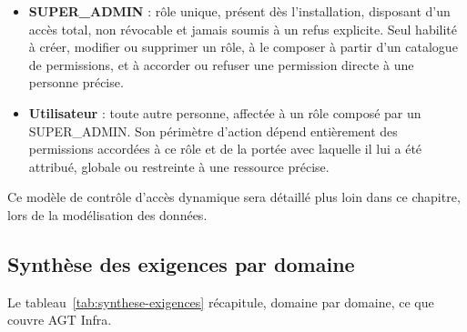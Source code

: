 \begin{itemize}
  \item \textbf{SUPER\_ADMIN} : rôle unique, présent dès l'installation,
        disposant d'un accès total, non révocable et jamais soumis à un
        refus explicite. Seul habilité à créer, modifier ou supprimer un
        rôle, à le composer à partir d'un catalogue de permissions, et à
        accorder ou refuser une permission directe à une personne
        précise.
  \item \textbf{Utilisateur} : toute autre personne, affectée à un rôle
        composé par un SUPER\_ADMIN. Son périmètre d'action dépend
        entièrement des permissions accordées à ce rôle et de la portée
        avec laquelle il lui a été attribué, globale ou restreinte à une
        ressource précise.
\end{itemize}

Ce modèle de contrôle d'accès dynamique sera détaillé plus loin dans ce
chapitre, lors de la modélisation des données.

\subsection{Synthèse des exigences par domaine}

Le tableau~\ref{tab:synthese-exigences} récapitule, domaine par domaine, ce
que couvre AGT Infra.

